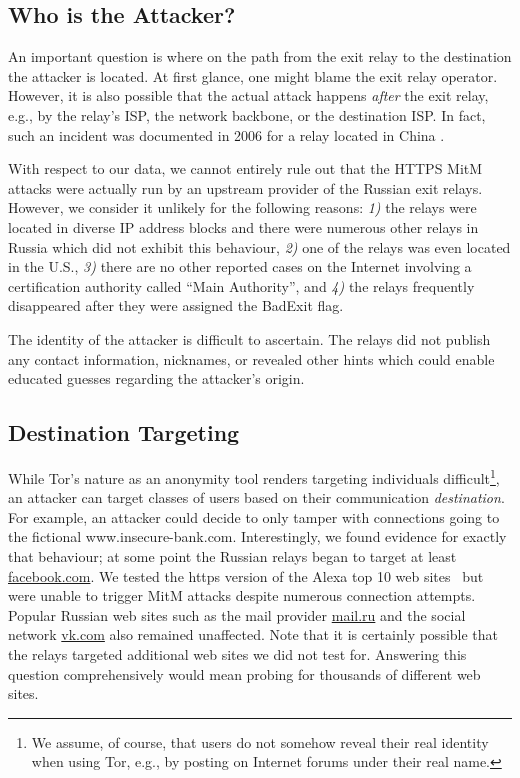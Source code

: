 \documentclass[letterpaper,twocolumn,10pt]{article}
\begin{document}
\subsection{Who is the Attacker?}
An important question is where on the path from the exit relay to the destination the attacker is
located.  At first glance, one might blame the exit relay operator.  However, it is also possible
that the actual attack happens \emph{after} the exit relay, e.g., by the relay's ISP, the network
backbone, or the destination ISP.  In fact, such an incident was documented in 2006 for a relay
located in China \cite{upstream}.

With respect to our data, we cannot entirely rule out that the HTTPS MitM attacks were actually run
by an upstream provider of the Russian exit relays.  However, we consider it unlikely for the
following reasons: \emph{1)} the relays were located in diverse IP address blocks and there were
numerous other relays in Russia which did not exhibit this behaviour, \emph{2)} one of the relays
was even located in the U.S., \emph{3)} there are no other reported cases on the Internet involving
a certification authority called ``Main Authority'', and \emph{4)} the relays frequently disappeared
after they were assigned the BadExit flag.

The identity of the attacker is difficult to ascertain.  The relays did not publish any contact
information, nicknames, or revealed other hints which could enable educated guesses regarding the
attacker's origin.

\subsection{Destination Targeting}
While Tor's nature as an anonymity tool renders targeting individuals difficult\footnote{We assume,
of course, that users do not somehow reveal their real identity when using Tor, e.g., by posting on
Internet forums under their real name.}, an attacker can target classes of users based on their
communication \emph{destination}.  For example, an attacker could decide to only tamper with
connections going to the fictional www.insecure-bank.com.  Interestingly, we found evidence for
exactly that behaviour; at some point the Russian relays began to target at least
\url{facebook.com}.  We tested the https version of the Alexa top 10 web sites~\cite{alexa} but were
unable to trigger MitM attacks despite numerous connection attempts.  Popular Russian web sites such
as the mail provider \url{mail.ru} and the social network \url{vk.com} also remained unaffected.
Note that it is certainly possible that the relays targeted additional web sites we did not test
for.  Answering this question comprehensively would mean probing for thousands of different web
sites.
\end{document}
